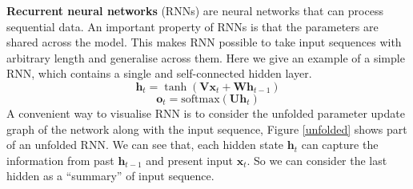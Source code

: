 	\noindent
\textbf{Recurrent neural networks} (RNNs) are neural networks that can process sequential data. 
An important property of RNNs is that the parameters are shared across the model\cite{elman1991distributed}. 
This makes RNN possible to take input sequences with arbitrary length and generalise across them.
Here we give an example of a simple RNN, which contains a single and self-connected hidden layer.
	\begin{equation}\label{eq:ht}
	\mathbf{h}_{t} = \tanh(\mathbf{V}\mathbf{x}_{t} + \mathbf{W}\mathbf{h}_{t-1})
	\end{equation}
	\begin{equation}\label{eq:yt}
	\mathbf{o}_{t} = \text{softmax}(\mathbf{U}\mathbf{h}_{t})
	\end{equation}
A convenient way to visualise RNN is to consider the unfolded parameter update graph of the network along with the input sequence, Figure \ref{unfolded} shows part of an unfolded RNN\cite{Goodfellow2016Book}.
We can see that, each hidden state $\mathbf{h}_{t}$ can capture the information from past $\mathbf{h}_{t-1}$ and present input $\mathbf{x}_{t}$. 
So we can consider the last hidden as a ``summary'' of input sequence. 
